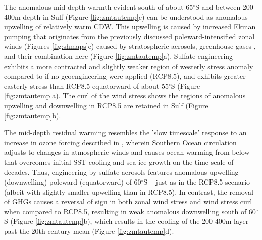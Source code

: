 \documentclass[draft,grl]{AGUTeX}  %
\begin{document}
\begin{article}
The anomalous mid-depth warmth evident south of about 65$^\circ$S and between 200-400m depth in Sulf (Figure \ref{fig:zmtautemp}c) can be understood as anomalous upwelling of relatively warm CDW. This upwelling is caused by increased Ekman pumping that originates from the previously discussed poleward-intensified zonal winds (Figures \ref{fig:shmaps}e) caused by stratospheric aerosols, greenhouse gases \citep{fyfe07}, and their combination here (Figure \ref{fig:zmtautemp}a). Sulfate engineering exhibits a more contracted and slightly weaker region of westerly stress anomaly compared to if no geoengineering were applied (RCP8.5), and exhibits greater easterly stress than RCP8.5 equatorward of about 55$^\circ$S (Figure \ref{fig:zmtautemp}a). The curl of the wind stress shows the regions of anomalous upwelling and downwelling in RCP8.5 are retained in Sulf (Figure \ref{fig:zmtautemp}b). %

The mid-depth residual warming resembles the 'slow timescale' response to an increase in ozone forcing described in \citet{ferreira14}, wherein Southern Ocean circulation adjusts to changes in atmospheric winds and causes ocean warming from below that overcomes initial SST cooling and sea ice growth on the time scale of decades. Thus, engineering by sulfate aerosols features anomalous upwelling (downwelling) poleward (equatorward) of 60$^\circ$S -- just as in the RCP8.5 scenario (albeit with slightly smaller upwelling than in RCP8.5).  In contrast, the removal of GHGs causes a reversal of sign in both zonal wind stress and wind stress curl when compared to RCP8.5, resulting in weak anomalous downwelling south of 60$^\circ$S (Figure \ref{fig:zmtautemp}b), which results in the cooling of the 200-400m layer past the 20th century mean (Figure \ref{fig:zmtautemp}d). %


\end{article}
\end{document}
